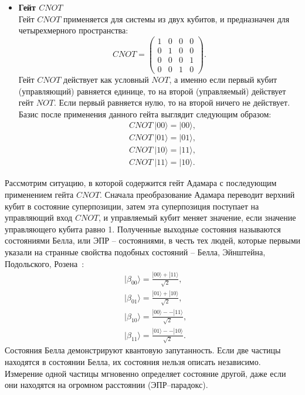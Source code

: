 \documentclass[12pt,a4paper]{article}
\begin{document}
\begin{itemize}
		\item \textbf{Гейт $CNOT$} \\
		Гейт $CNOT$ применяется для системы из двух кубитов, и
		предназначен для четырехмерного пространства:
		\begin{equation}
			CNOT = 
			\begin{pmatrix}
				1 & 0 & 0 & 0 \\
				0 & 1 & 0 & 0 \\
				0 & 0 & 0 & 1 \\
				0 & 0 & 1 & 0 
			\end{pmatrix}.
		\end{equation}
		Гейт $CNOT$ действует как условный $NOT$, а именно если первый кубит (управляющий) равняется единице, то на второй (управляемый) действует гейт $NOT$. Если первый равняется нулю, то на второй ничего не действует. Базис после применения данного гейта выглядит следующим образом:
		\begin{equation}
			\begin{split}
				&CNOT~|00\rangle = |00\rangle, \\
				&CNOT~|01\rangle = |01\rangle, \\	
				&CNOT~|10\rangle = |11\rangle, \\
				&CNOT~|11\rangle = |10\rangle.
			\end{split}
		\end{equation}
	\end{itemize}
	Рассмотрим ситуацию, в которой содержится гейт Адамара с последующим применением гейта $CNOT$. Сначала преобразование Адамара переводит верхний кубит в состояние суперпозиции, затем эта суперпозиция поступает на управляющий вход $CNOT$, и управляемый кубит меняет значение, если значение управляющего кубита равно 1. Полученные выходные состояния называются состояниями Белла, или ЭПР -- состояниями, в честь тех людей, которые первыми указали на странные свойства подобных состояний -- Белла, Эйнштейна, Подольского, Розена~\cite{1}:
	\begin{equation}
		\begin{split}
			&|\beta_{00} \rangle = \frac{|00 \rangle + |11\rangle}{\sqrt{2}}, \\
			&|\beta_{01} \rangle = \frac{|01 \rangle + |10\rangle}{\sqrt{2}}, \\
			&|\beta_{10} \rangle = \frac{|00 \rangle -- |11\rangle}{\sqrt{2}}, \\
			&|\beta_{11} \rangle = \frac{|01 \rangle -- |10\rangle}{\sqrt{2}}.
		\end{split}
	\end{equation}
	Состояния Белла демонстрируют квантовую запутанность. Если две частицы находятся в состоянии Белла, их состояния нельзя описать независимо. Измерение одной частицы мгновенно определяет состояние другой, даже если они находятся на огромном расстоянии (ЭПР--парадокс).
\end{document}

